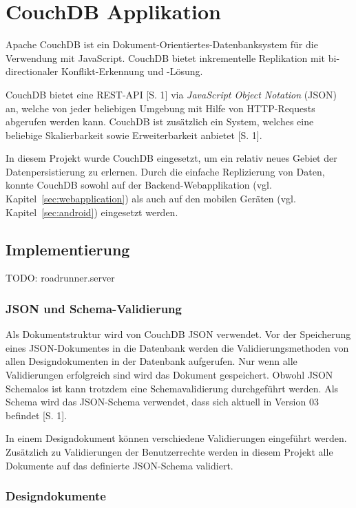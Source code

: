 \section{CouchDB Applikation}
\label{sec:couchdb}

Apache CouchDB ist ein Dokument-Orientiertes-Datenbanksystem für die Verwendung
	mit JavaScript. CouchDB bietet inkrementelle Replikation mit bi-directionaler
	Konflikt-Erkennung und -Lösung.
	
CouchDB bietet eine REST-API \cite{Fowler10}[S. 1] via \emph{JavaScript Object
	Notation} (JSON) an, welche von jeder beliebigen Umgebung mit Hilfe von
	HTTP-Requests abgerufen werden kann. CouchDB ist zusätzlich ein System, welches
	eine beliebige Skalierbarkeit sowie Erweiterbarkeit anbietet
	\cite{CouchDB11}[S. 1].
	
In diesem Projekt wurde CouchDB eingesetzt, um ein relativ neues Gebiet der
	Datenpersistierung zu erlernen. Durch die einfache Replizierung von Daten,
	konnte CouchDB sowohl auf der Backend-Webapplikation (vgl.
	Kapitel~\ref{sec:webapplication}) als auch auf den mobilen Geräten (vgl.
	Kapitel~\ref{sec:android}) eingesetzt werden.

\subsection{Implementierung}

TODO: roadrunner.server

\subsubsection{JSON und Schema-Validierung}
Als Dokumentstruktur wird von CouchDB JSON verwendet. Vor der Speicherung eines
	JSON-Dokumentes in die Datenbank werden die Validierungsmethoden von allen
	Designdokumenten in der Datenbank aufgerufen. Nur wenn alle Validierungen
	erfolgreich sind wird das Dokument gespeichert. Obwohl JSON Schemalos ist
	kann trotzdem eine Schemavalidierung durchgeführt werden. Als Schema wird
	das JSON-Schema verwendet, dass sich aktuell in Version 03
	befindet \cite{IETF11}[S. 1]. 

In einem Designdokument können verschiedene Validierungen eingeführt werden.
	Zusätzlich zu Validierungen der Benutzerrechte werden in diesem Projekt alle
	Dokumente auf das definierte JSON-Schema validiert.

\subsubsection{Designdokumente}

